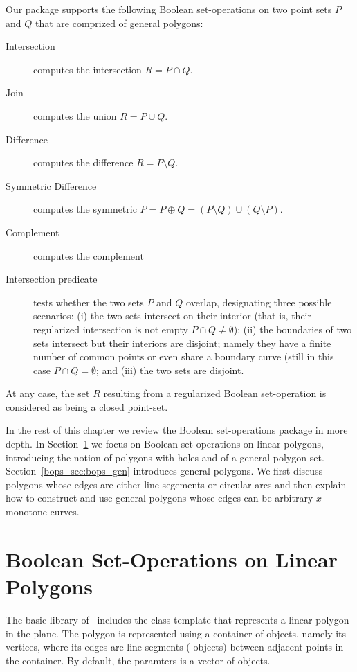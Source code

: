 Our package supports the following Boolean set-operations on two point
sets $P$ and $Q$ that are comprized of general polygons:
\begin{description}
\item[Intersection] computes the intersection $R = P \cap Q$.
\item[Join] computes the union $R = P \cup Q$.
\item [Difference] computes the difference $R = P \setminus Q$.
\item [Symmetric Difference] computes the symmetric
   $P = P \oplus Q = (P \setminus Q) \cup (Q \setminus P)$.
\item[Complement] computes the complement
\item [Intersection predicate] tests whether the two sets $P$ and $Q$
  overlap, designating three possible scenarios: (i) the two sets intersect
  on their interior (that is, their regularized intersection is not
  empty $P \cap Q \neq \emptyset$); (ii) the boundaries of two sets intersect
  but their interiors are disjoint; namely they have a finite number
  of common points or even share a boundary curve (still in this case
  $P \cap Q = \emptyset$; and (iii) the two sets are disjoint.
\end{description}
At any case, the set $R$ resulting from a regularized Boolean set-operation
is considered as being a closed point-set.

In the rest of this chapter we review the Boolean set-operations package
in more depth. In Section~\ref{bops_sec:bops_lin} we focus on Boolean 
set-operations on linear polygons, introducing the notion of polygons with 
holes and of a general polygon set. Section~\ref{bops_sec:bops_gen}
introduces general polygons.
We first discuss polygons whose edges are either line segements or circular
arcs and then explain how to construct and use general polygons whose edges
can be arbitrary $x$-monotone curves.

\section{Boolean Set-Operations on Linear Polygons}
\label{bops_sec:bops_lin}

The basic library of \cgal\ includes the 
class-template that represents a linear polygon in the plane. The polygon
is represented using a container of  objects, namely
its vertices, where its edges are line segments (
objects) between adjacent points in the container. By default, the
 paramters is a vector of  objects.


